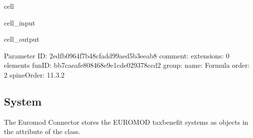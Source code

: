 \documentclass[letterpaper,10pt,english]{sphinxmanual}
\begin{document}
\begin{sphinxuseclass}{cell}
\begin{sphinxuseclass}{cell_input}
\begin{sphinxVerbatim}[commandchars=\\\{\}]
\PYG{p}{[}\PYG{p}{]}\PYG{p}{[}\PYG{p}{]}\PYG{p}{[}\PYG{p}{]}\PYG{p}{[}\PYG{p}{]}
\end{sphinxVerbatim}

\end{sphinxuseclass}
\begin{sphinxuseclass}{cell_output}
\begin{sphinxVerbatim}[commandchars=\\\{\}]
\PYGZhy{}\PYGZhy{}\PYGZhy{}\PYGZhy{}\PYGZhy{}\PYGZhy{}\PYGZhy{}\PYGZhy{}\PYGZhy{}\PYGZhy{}\PYGZhy{}\PYGZhy{}\PYGZhy{}\PYGZhy{}\PYGZhy{}\PYGZhy{}\PYGZhy{}\PYGZhy{}\PYGZhy{}\PYGZhy{}\PYGZhy{}\PYGZhy{}\PYGZhy{}\PYGZhy{}\PYGZhy{}\PYGZhy{}\PYGZhy{}\PYGZhy{}\PYGZhy{}\PYGZhy{}
Parameter
\PYGZhy{}\PYGZhy{}\PYGZhy{}\PYGZhy{}\PYGZhy{}\PYGZhy{}\PYGZhy{}\PYGZhy{}\PYGZhy{}\PYGZhy{}\PYGZhy{}\PYGZhy{}\PYGZhy{}\PYGZhy{}\PYGZhy{}\PYGZhy{}\PYGZhy{}\PYGZhy{}\PYGZhy{}\PYGZhy{}\PYGZhy{}\PYGZhy{}\PYGZhy{}\PYGZhy{}\PYGZhy{}\PYGZhy{}\PYGZhy{}\PYGZhy{}\PYGZhy{}\PYGZhy{}
	 ID: \PYGZsq{}2edfb096\PYGZhy{}4f7b\PYGZhy{}48cf\PYGZhy{}add9\PYGZhy{}9aed5b3eeab8\PYGZsq{}
	 comment: \PYGZsq{}\PYGZsq{}
	 extensions: 0 elements
	 funID: \PYGZsq{}bb7caeaf\PYGZhy{}e808\PYGZhy{}468e\PYGZhy{}9e1c\PYGZhy{}de029378ccd2\PYGZsq{}
	 group: \PYGZsq{}\PYGZsq{}
	 name: \PYGZsq{}Formula\PYGZsq{}
	 order: \PYGZsq{}2\PYGZsq{}
	 spineOrder: \PYGZsq{}11.3.2\PYGZsq{}
\end{sphinxVerbatim}

\end{sphinxuseclass}
\end{sphinxuseclass}

\subsection{System}
\label{\detokenize{userguide:system}}
\sphinxAtStartPar
The Euromod Connector stores the EUROMOD tax\sphinxhyphen{}benefit systems as  objects in the attribute  of the  class.
\end{document}
